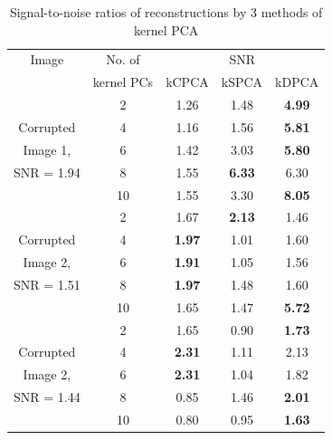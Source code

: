 \documentclass[10pt, conference, compsocconf]{IEEEtran}
\begin{document}





\begin{table}[b]
\begin{center}
    \begin{tabular}{c|c|ccc}
    \hline
   Image           & No. of     & \multicolumn{3}{c}{SNR}\\\cline{3-5}
                   & kernel PCs & kCPCA & kSPCA & kDPCA \\ \hline
    ~              & 2          & 1.26  & 1.48  & \textbf{4.99}  \\
    Corrupted      & 4          & 1.16  & 1.56  & \textbf{5.81}  \\
    Image 1,       & 6          & 1.42  & 3.03  & \textbf{5.80}  \\
    SNR = 1.94     & 8          & 1.55  & \textbf{6.33}  & 6.30  \\
    ~              & 10         & 1.55  & 3.30  & \textbf{8.05}  \\ \hline
    ~              & 2          & 1.67  & \textbf{2.13}  & 1.46  \\
    Corrupted      & 4          & \textbf{1.97}  & 1.01  & 1.60  \\
    Image 2,       & 6          & \textbf{1.91}  & 1.05  & 1.56  \\
    SNR = 1.51     & 8          & \textbf{1.97}  & 1.48  & 1.60  \\
    ~              & 10         & 1.65  & 1.47  & \textbf{5.72}  \\ \hline
    ~              & 2          & 1.65  & 0.90  & \textbf{1.73}  \\
    Corrupted      & 4          & \textbf{2.31}  & 1.11  & 2.13  \\
    Image 2,       & 6          & \textbf{2.31}  & 1.04  & 1.82  \\
    SNR = 1.44     & 8          & 0.85  & 1.46  & \textbf{2.01}  \\
    ~              & 10         & 0.80  & 0.95  & \textbf{1.63}  \\ \hline
    \end{tabular}
\end{center}
\caption{Signal-to-noise ratios of reconstructions by 3 methods of kernel PCA}
\label{table:SNRtable}
\end{table}
\end{document}
